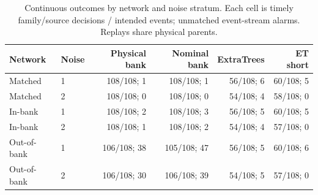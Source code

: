 \begin{table}[t]\centering\small
\caption{Continuous outcomes by network and noise stratum. Each cell is timely family/source decisions / intended events; unmatched event-stream alarms. Replays share physical parents.}
\label{tab:review_continuous}
\begin{tabular}{llrrrr}\toprule
Network & Noise & Physical bank & Nominal bank & ExtraTrees & ET short\\\midrule
Matched & 1 & 108/108; 1 & 108/108; 1 & 56/108; 6 & 60/108; 5\\
Matched & 2 & 108/108; 0 & 108/108; 0 & 54/108; 4 & 58/108; 0\\
In-bank & 1 & 108/108; 2 & 108/108; 3 & 56/108; 5 & 60/108; 5\\
In-bank & 2 & 108/108; 1 & 108/108; 2 & 54/108; 4 & 57/108; 0\\
Out-of-bank & 1 & 106/108; 38 & 105/108; 47 & 56/108; 5 & 60/108; 6\\
Out-of-bank & 2 & 106/108; 30 & 106/108; 39 & 54/108; 5 & 57/108; 0\\
\bottomrule\end{tabular}
\end{table}

